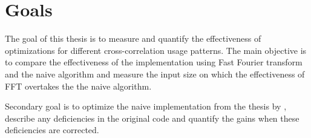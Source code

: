 \section{Goals}

The goal of this thesis is to measure and quantify the effectiveness of optimizations for different cross-correlation usage patterns. The main objective is to compare the effectiveness of the implementation using Fast Fourier transform and the naive algorithm and measure the input size on which the effectiveness of FFT overtakes the the naive algorithm.

Secondary goal is to optimize the naive implementation from the thesis by \citep{misko}, describe any deficiencies in the original code and quantify the gains when these deficiencies are corrected.